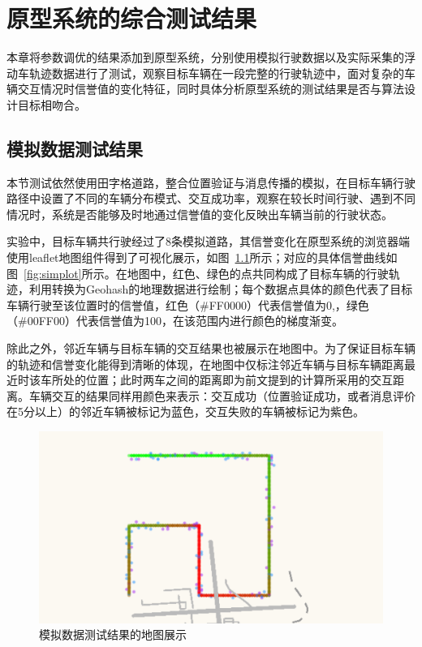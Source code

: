 \chapter{原型系统的综合测试结果}
本章将参数调优的结果添加到原型系统，分别使用模拟行驶数据以及实际采集的浮动车轨迹数据进行了测试，观察目标车辆在一段完整的行驶轨迹中，面对复杂的车辆交互情况时信誉值的变化特征，同时具体分析原型系统的测试结果是否与算法设计目标相吻合。

\section{模拟数据测试结果}
本节测试依然使用田字格道路，整合位置验证与消息传播的模拟，在目标车辆行驶路径中设置了不同的车辆分布模式、交互成功率，观察在较长时间行驶、遇到不同情况时，系统是否能够及时地通过信誉值的变化反映出车辆当前的行驶状态。

实验中，目标车辆共行驶经过了8条模拟道路，其信誉变化在原型系统的浏览器端使用leaflet地图组件得到了可视化展示，如图~\ref{fig:simmap}所示；对应的具体信誉曲线如图~\ref{fig:simplot}所示。在地图中，红色、绿色的点共同构成了目标车辆的行驶轨迹，利用转换为Geohash的地理数据进行绘制；每个数据点具体的颜色代表了目标车辆行驶至该位置时的信誉值，红色（\#FF0000）代表信誉值为0,，绿色（\#00FF00）代表信誉值为100，在该范围内进行颜色的梯度渐变。

除此之外，邻近车辆与目标车辆的交互结果也被展示在地图中。为了保证目标车辆的轨迹和信誉变化能得到清晰的体现，在地图中仅标注邻近车辆与目标车辆距离最近时该车所处的位置；此时两车之间的距离即为前文提到的计算所采用的交互距离。车辆交互的结果同样用颜色来表示：交互成功（位置验证成功，或者消息评价在5分以上）的邻近车辆被标记为蓝色，交互失败的车辆被标记为紫色。

\begin{figure}
  \centering
  \includegraphics[width=0.8\linewidth]{figures/map4.png}
  \caption{模拟数据测试结果的地图展示}
  \label{fig:simmap}
\end{figure}

